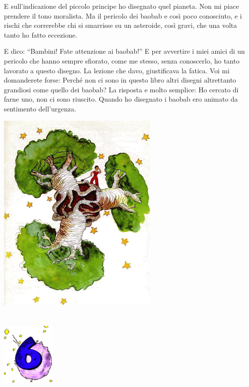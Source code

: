 \documentclass[11pt]{scrbook}
\begin{document}
E sull'indicazione del piccolo principe ho disegnato quel pianeta. Non
mi piace prendere il tono moralista. Ma il pericolo dei baobab e così
poco conosciuto, e i rischi che correrebbe chi si smarrisse su un
asteroide, così gravi, che una volta tanto ho fatto eccezione.

E dico: ``Bambini! Fate attenzione ai baobab!'' E per avvertire i miei
amici di un pericolo che hanno sempre sfiorato, come me stesso, senza
conoscerlo, ho tanto lavorato a questo disegno. La lezione che davo,
giustificava la fatica. Voi mi domanderete forse: Perché non ci sono in
questo libro altri disegni altrettanto grandiosi come quello dei baobab?
La risposta e molto semplice: Ho cercato di farne uno, non ci sono
riuscito. Quando ho disegnato i baobab ero animato da sentimento
dell'urgenza.

\begin{center}
\includegraphics{img/baobaby}
\end{center}

\chapter{}
\begin{center}
\includegraphics{img/chapter6}
\end{center}
\end{document}
